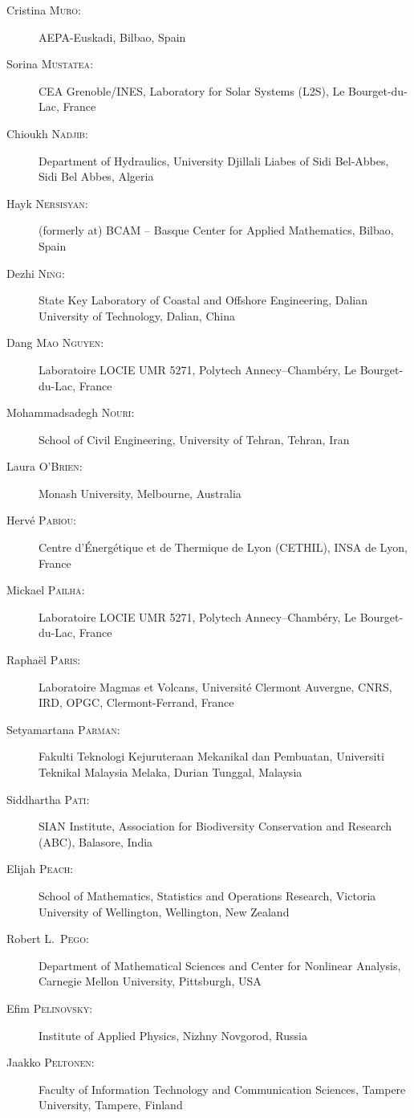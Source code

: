 \documentclass[final, a4paper, oneside, 12pt]{article}
\numberwithin{equation}{section}
\begin{document}
\begin{description}
  \item[Cristina \textsc{Muro}:] AEPA-Euskadi, Bilbao, Spain
  \item[Sorina \textsc{Mustatea}:] CEA Grenoble/INES, Laboratory for Solar Systems (L2S), Le Bourget-du-Lac, France
  \item[Chioukh \textsc{Nadjib}:] Department of Hydraulics, University Djillali Liabes of Sidi Bel-Abbes, Sidi Bel Abbes, Algeria
  \item[Hayk \textsc{Nersisyan}:] (formerly at) BCAM -- Basque Center for Applied Mathematics, Bilbao, Spain
  \item[Dezhi \textsc{Ning}:] State Key Laboratory of Coastal and Offshore Engineering, Dalian University of Technology, Dalian, China
  \item[Dang \textsc{Mao Nguyen}:] Laboratoire LOCIE UMR 5271, Polytech Annecy--Chamb\'ery, Le Bourget-du-Lac, France
  \item[Mohammadsadegh \textsc{Nouri}:] School of Civil Engineering, University of Tehran, Tehran, Iran
  \item[Laura \textsc{O'Brien}:] Monash University, Melbourne, Australia
  \item[Herv\'e \textsc{Pabiou}:] Centre d'\'Energ\'etique et de Thermique de Lyon (CETHIL), INSA de Lyon, France
  \item[Mickael \textsc{Pailha}:] Laboratoire LOCIE UMR 5271, Polytech Annecy--Chamb\'ery, Le Bourget-du-Lac, France
  \item[Rapha\"el \textsc{Paris}:] Laboratoire Magmas et Volcans, Universit\'e Clermont Auvergne, CNRS, IRD, OPGC, Clermont-Ferrand, France
  \item[Setyamartana \textsc{Parman}:] Fakulti Teknologi Kejuruteraan Mekanikal dan Pembuatan, Universiti Teknikal Malaysia Melaka, Durian Tunggal, Malaysia
  \item[Siddhartha \textsc{Pati}:] SIAN Institute, Association for Biodiversity Conservation and Research (ABC), Balasore, India
  \item[Elijah \textsc{Peach}:] School of Mathematics, Statistics and Operations Research, Victoria University of Wellington, Wellington, New Zealand
  \item[Robert L.~\textsc{Pego}:] Department of Mathematical Sciences and Center for Nonlinear Analysis, Carnegie Mellon University, Pittsburgh, USA
  \item[Efim \textsc{Pelinovsky}:] Institute of Applied Physics, Nizhny Novgorod, Russia
  \item[Jaakko \textsc{Peltonen}:] Faculty of Information Technology and Communication Sciences, Tampere University, Tampere, Finland

\end{description}
\end{document}
